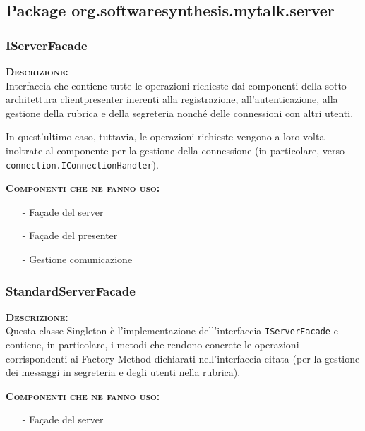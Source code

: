\subsection{Package org.softwaresynthesis.mytalk.server}
\subsubsection{IServerFacade}
\begin{description}
	\item{\scshape\bfseries Descrizione:}\\
Interfaccia che contiene tutte le operazioni richieste dai componenti della sotto-architettura clientpresenter inerenti alla registrazione, all'autenticazione,  alla gestione della rubrica e della segreteria nonché delle connessioni con altri utenti.

In quest'ultimo caso, tuttavia, le operazioni richieste vengono a loro volta inoltrate al componente per la gestione della connessione (in particolare, verso \texttt{connection.IConnectionHandler}).
	\item{\scshape\bfseries Componenti che ne fanno uso:}
	\begin{itemize}[noitemsep,nolistsep]
	  \item[-] Façade del server
	  \item[-] Façade del presenter
	  \item[-] Gestione comunicazione
	\end{itemize}
\end{description}

\subsubsection{StandardServerFacade}
\begin{description}
	\item{\scshape\bfseries Descrizione:}\\
Questa classe Singleton è l'implementazione dell'interfaccia \texttt{IServerFacade} e contiene, in particolare, i metodi che rendono concrete le operazioni corrispondenti ai Factory Method dichiarati nell'interfaccia citata (per la gestione dei messaggi in segreteria e degli utenti nella rubrica).
	\item{\scshape\bfseries Componenti che ne fanno uso:}
	\begin{itemize}[noitemsep,nolistsep]
	  \item[-] Façade del server
	\end{itemize}
\end{description}


